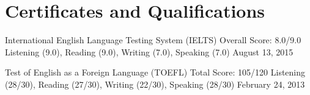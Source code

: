 \section*{Certificates and Qualifications}

\certificate
  {International English Language Testing System (IELTS)}
  {Overall Score: 8.0/9.0}
  {Listening (9.0), Reading (9.0), Writing (7.0), Speaking (7.0)}
  {August 13, 2015}

\certificate
  {Test of English as a Foreign Language (TOEFL)}
  {Total Score: 105/120}
  {Listening (28/30), Reading (27/30), Writing (22/30), Speaking (28/30)}
  {February 24, 2013}
